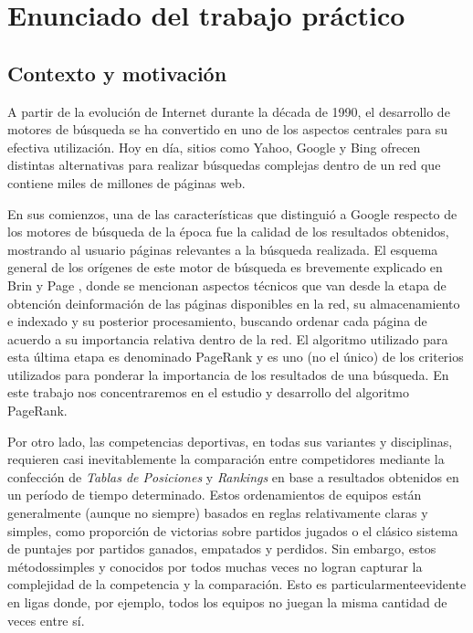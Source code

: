 \section{Enunciado del trabajo práctico}

    \subsection*{Contexto y motivaci\'on}

        A partir de la evoluci\'on de Internet durante la d\'ecada de 1990, el desarrollo de motores de b\'usqueda se ha convertido en uno de los aspectos centrales para su efectiva utilizaci\'on. Hoy en d\'ia, sitios como Yahoo, Google y Bing ofrecen distintas alternativas para realizar b\'usquedas complejas dentro de un red que contiene miles de millones de p\'aginas web. 

        En sus comienzos, una de las caracter\'isticas que distingui\'o a Google respecto de los motores de b\'usqueda de la \'epoca fue la calidad de los resultados obtenidos, mostrando al usuario p\'aginas relevantes a la b\'usqueda realizada. El esquema general de los or\'igenes de este motor de b\'usqueda es brevemente explicado en Brin y Page \cite{Brin1998}, donde se mencionan aspectos t\'ecnicos que van desde la etapa de obtenci\'on deinformaci\'on de las p\'aginas disponibles en la red, su almacenamiento e indexado y su posterior procesamiento, buscando ordenar cada p\'agina de acuerdo a su importancia relativa dentro de la red. El algoritmo utilizado para esta \'ultima etapa es denominado PageRank y es uno (no el \'unico) de los criterios utilizados para ponderar la importancia de los resultados de una b\'usqueda. En este trabajo nos concentraremos en el estudio y desarrollo del algoritmo PageRank.

        Por otro lado, las competencias deportivas, en todas sus variantes y disciplinas, requieren casi inevitablemente la comparaci\'on entre competidores mediante la confecci\'on de \emph{Tablas de Posiciones} y \emph{Rankings} en base a resultados obtenidos en un per\'iodo de tiempo determinado. Estos ordenamientos de equipos est\'an generalmente (aunque no siempre) basados en reglas relativamente claras y simples, como proporci\'on de victorias sobre partidos jugados o el cl\'asico sistema de puntajes por partidos ganados, empatados y perdidos. Sin embargo, estos m\'etodossimples y conocidos por todos muchas veces no logran capturar la complejidad de la competencia y la comparaci\'on. Esto es particularmenteevidente en ligas donde, por ejemplo, todos los equipos no juegan la misma cantidad de veces entre s\'i.

